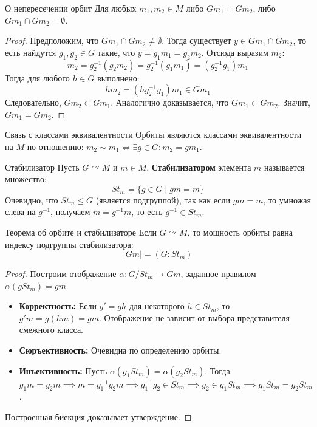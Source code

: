 \begin{Lemma}{О непересечении орбит}{}
	Для любых $m_1, m_2 \in M$ либо $Gm_1 = Gm_2$, либо $Gm_1 \cap Gm_2 = \emptyset$.
\end{Lemma}

\begin{proof}
	Предположим, что $Gm_1 \cap Gm_2 \neq \emptyset$. Тогда существует $y \in Gm_1 \cap Gm_2$, то есть найдутся $g_1, g_2 \in G$ такие, что $y = g_1 m_1 = g_2 m_2$. 
	Отсюда выразим $m_2$:
	\[ m_2 = g_2^{-1}(g_2 m_2) = g_2^{-1}(g_1 m_1) = (g_2^{-1}g_1)m_1 \]
	Тогда для любого $h \in G$ выполнено:
	\[ h m_2 = (h g_2^{-1}g_1)m_1 \in Gm_1 \]
	Следовательно, $Gm_2 \subset Gm_1$. Аналогично доказывается, что $Gm_1 \subset Gm_2$. Значит, $Gm_1 = Gm_2$.
\end{proof}

\begin{Remark}{Связь с классами эквивалентности}{}
	Орбиты являются классами эквивалентности на $M$ по отношению: $m_2 \sim m_1 \iff \exists g \in G \colon m_2 = gm_1$.
\end{Remark}

\begin{Definition}{Стабилизатор}{}
	Пусть $G \curvearrowright M$ и $m \in M$. \textbf{Стабилизатором} элемента $m$ называется множество:
	\[ St_m = \{g \in G \mid gm = m\} \]
	Очевидно, что $St_m \le G$ (является подгруппой), так как если $gm=m$, то умножая слева на $g^{-1}$, получаем $m = g^{-1}m$, то есть $g^{-1} \in St_m$.
\end{Definition}

\begin{Proposition}{Теорема об орбите и стабилизаторе}{}
	Если $G \curvearrowright M$, то мощность орбиты равна индексу подгруппы стабилизатора:
	\[ |Gm| = (G : St_m) \]
\end{Proposition}

\begin{proof}
	Построим отображение $\alpha \colon G/St_m \to Gm$, заданное правилом $\alpha(gSt_m) = gm$.
	\begin{itemize}
		\item \textbf{Корректность:} Если $g' = gh$ для некоторого $h \in St_m$, то $g'm = g(hm) = gm$. Отображение не зависит от выбора представителя смежного класса.
		\item \textbf{Сюръективность:} Очевидна по определению орбиты.
		\item \textbf{Инъективность:} Пусть $\alpha(g_1 St_m) = \alpha(g_2 St_m)$. Тогда $g_1 m = g_2 m \implies m = g_1^{-1}g_2 m \implies g_1^{-1}g_2 \in St_m \implies g_2 \in g_1 St_m \implies g_1 St_m = g_2 St_m$.
	\end{itemize}
	Построенная биекция доказывает утверждение.
\end{proof}


